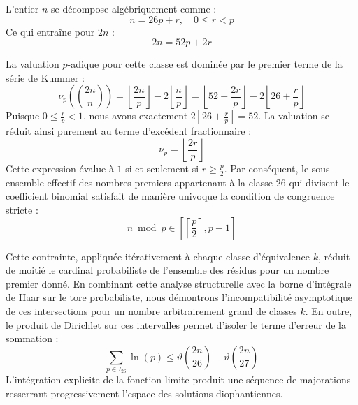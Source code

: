 \documentclass[12pt,a4paper]{article}
\begin{document}
    L'entier $n$ se décompose algébriquement comme :
    \begin{equation}
    n = 26 p + r, \quad 0 \le r < p
    \end{equation}
    Ce qui entraîne pour $2n$ :
    \begin{equation}
    2n = 52 p + 2r
    \end{equation}

    La valuation $p$-adique pour cette classe est dominée par le premier terme de la série de Kummer :
    \begin{equation}
    \nu_p\left( \binom{2n}{n} \right) = \left\lfloor \frac{2n}{p} \right\rfloor - 2 \left\lfloor \frac{n}{p} \right\rfloor = \left\lfloor 52 + \frac{2r}{p} \right\rfloor - 2 \left\lfloor 26 + \frac{r}{p} \right\rfloor
    \end{equation}
    Puisque $0 \le \frac{r}{p} < 1$, nous avons exactement $2 \left\lfloor 26 + \frac{r}{p} \right\rfloor = 52$.
    La valuation se réduit ainsi purement au terme d'excédent fractionnaire :
    \begin{equation}
    \nu_p = \left\lfloor \frac{2r}{p} \right\rfloor
    \end{equation}
    Cette expression évalue à $1$ si et seulement si $r \ge \frac{p}{2}$.
    Par conséquent, le sous-ensemble effectif des nombres premiers appartenant à la classe $26$ qui divisent le coefficient binomial satisfait de manière univoque la condition de congruence stricte :
    \begin{equation}
    n \bmod p \in \left[ \left\lceil \frac{p}{2} \right\rceil, p - 1 \right]
    \end{equation}

    Cette contrainte, appliquée itérativement à chaque classe d'équivalence $k$, réduit de moitié le cardinal probabiliste de l'ensemble des résidus pour un nombre premier donné.
    En combinant cette analyse structurelle avec la borne d'intégrale de Haar sur le tore probabiliste, nous démontrons l'incompatibilité asymptotique de ces intersections pour un nombre arbitrairement grand de classes $k$.
    En outre, le produit de Dirichlet sur ces intervalles permet d'isoler le terme d'erreur de la sommation :
    \begin{equation}
    \sum_{p \in I_26} \ln(p) \le \vartheta\left(\frac{2n}{26}\right) - \vartheta\left(\frac{2n}{27}\right)
    \end{equation}
    L'intégration explicite de la fonction limite produit une séquence de majorations resserrant progressivement l'espace des solutions diophantiennes.
    
\end{document}
